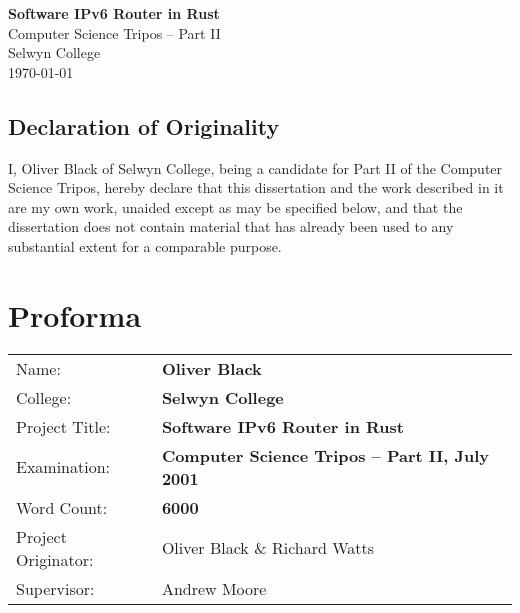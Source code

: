 \documentclass[12pt,a4paper,twoside,openright]{report}
\begin{document}





\pagestyle{empty}



\vspace*{60mm}
\begin{center}
\Huge
\textbf{Software IPv6 Router in Rust} \\[5mm]
Computer Science Tripos -- Part II \\[5mm]
Selwyn College \\[5mm]
\today  %
\end{center}

\newpage
{}
\section*{Declaration of Originality}

I, Oliver Black of Selwyn College, being a candidate for Part II of 
the Computer Science Tripos, hereby declare
that this dissertation and the work described in it are my own work,
unaided except as may be specified below, and that the dissertation
does not contain material that has already been used to any substantial
extent for a comparable purpose.

\bigskip
{}

\medskip
{}


\pagestyle{plain}

\chapter*{Proforma}

{\large
\begin{tabular}{ll}
Name:               & \bf Oliver Black                      \\
College:            & \bf Selwyn College                     \\
Project Title:      & \bf Software IPv6 Router in Rust \\
Examination:        & \bf Computer Science Tripos -- Part II, July 2001  \\
Word Count:         & \bf 6000 \footnotemark[1]
                       \\
Project Originator: & Oliver Black \& Richard Watts      \\
Supervisor:         & Andrew Moore                   \\ 
\end{tabular}
}
\end{document}
